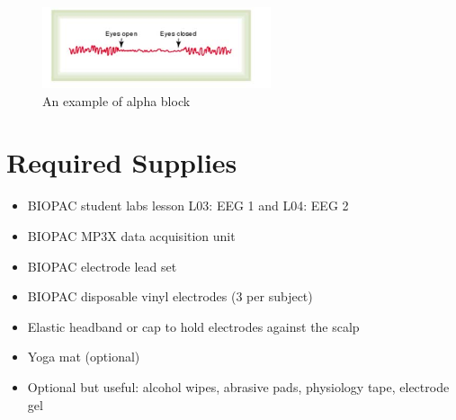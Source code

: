 \documentclass{article}
\begin{document}
\begin{figure}[h]
\centering
\includegraphics[width=0.6\textwidth]{../images/EEG_3.jpg}	
\caption{An example of alpha block}
\label{alphablock}
\end{figure}

\section*{Required Supplies}
\begin{itemize}
	\item BIOPAC student labs lesson L03: EEG 1 and L04: EEG 2
	\item BIOPAC MP3X data acquisition unit
	\item BIOPAC electrode lead set
	\item BIOPAC disposable vinyl electrodes (3 per subject)
	\item Elastic headband or cap to hold electrodes against the scalp
	\item Yoga mat (optional)
	\item Optional but useful: alcohol wipes, abrasive pads, physiology tape, electrode gel
\end{itemize}
\end{document}
